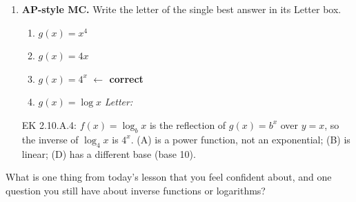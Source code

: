 \documentclass[10pt]{article}
\begin{document}
\begin{enumerate}[leftmargin=1.8em, itemsep=14pt]
\begin{enumerate}[leftmargin=1.5em, itemsep=6pt, label=\alph*.]
        \rubricbox{\gradedblank[id=hw5c, type=rubric, points=2,
  display={Each output of $h$ is twice that of $\log_3 x$: a vertical stretch by 2.}]{\linewidth}{13pt}}
\end{enumerate}

\newpage
\item \textbf{AP-style MC.} Write the letter of the single best answer in its Letter box.

\begin{enumerate}[leftmargin=2em, itemsep=4pt, label=(\Alph*)]
  \item $g(x) = x^4$
  \item $g(x) = 4x$
  \item $g(x) = 4^x$ \quad \textcolor{keyred}{\textbf{$\leftarrow$ correct}}
  \item $g(x) = \log x$ \hfill\textit{Letter:}~\gradedblank[id=hw6, type=choice, points=1, answer=C]{0.42in}{13pt}
\end{enumerate}

\begin{teachernote}
EK 2.10.A.4: $f(x) = \log_b x$ is the reflection of $g(x) = b^x$ over $y = x$, so the
inverse of $\log_4 x$ is $4^x$. (A) is a power function, not an exponential; (B) is linear;
(D) has a different base (base 10).
\end{teachernote}

\end{enumerate}

\vspace{0.12in}

\begin{reflectionbox}
What is one thing from today's lesson that you feel confident about, and one question you
still have about inverse functions or logarithms?

\end{reflectionbox}
\end{document}
